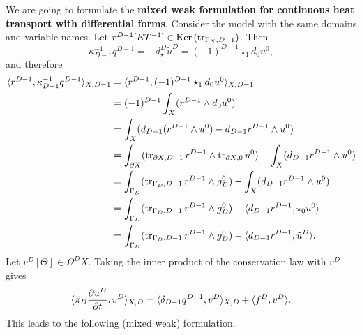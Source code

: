 \begin{discussion}
  We are going to formulate the \textbf{mixed weak formulation for continuous
  heat transport with differential forms}.
  Consider the model
  with the same domains and variable names.
  Let $r^{D - 1} [E T^{-1}] \in \mathop{\rm Ker}\nolimits \left(\mathop{\rm tr}\nolimits_{\Gamma_N, D - 1}\right)$.
  Then
  \begin{equation}
    \kappa_{D - 1}^{-1} q^{D - 1}
    = - d_\star^D \tilde{u}^D
    = (-1)^{D - 1} \star_1 d_0 u^0,
  \end{equation}
  and therefore
  \begin{equation}
    \begin{split}
      \langle r^{D - 1},\kappa_{D - 1}^{-1} q^{D - 1}\rangle_{X, D - 1}
      & = \langle r^{D - 1},(-1)^{D - 1} \star_1 d_0 u^0\rangle_{X, D - 1} \\
      & = (-1)^{D - 1} \int_X (r^{D - 1} \wedge d_0 u^0) \\
      & = \int_X
        (d_{D - 1}(r^{D - 1} \wedge u^0) - d_{D - 1} r^{D - 1} \wedge u^0) \\
      & = \int_{\partial X}
        (\mathop{\rm tr}\nolimits_{\partial X, D - 1} r^{D - 1} \wedge \mathop{\rm tr}\nolimits_{\partial X, 0} u^0)
        - \int_{X} (d_{D - 1} r^{D - 1} \wedge u^0) \\
      & = \int_{\Gamma_D} (\mathop{\rm tr}\nolimits_{\Gamma_D, D - 1} r^{D - 1} \wedge g_D^0)
        - \int_{X} (d_{D - 1} r^{D - 1} \wedge u^0) \\
      & = \int_{\Gamma_D} (\mathop{\rm tr}\nolimits_{\Gamma_D, D - 1} r^{D - 1} \wedge g_D^0)
        - \langle d_{D - 1} r^{D - 1},\star_0 u^0\rangle \\
      & = \int_{\Gamma_D} (\mathop{\rm tr}\nolimits_{\Gamma_D, D - 1} r^{D - 1} \wedge g_D^0)
        - \langle d_{D - 1} r^{D - 1},\tilde{u}^D\rangle.
    \end{split}
  \end{equation}
  Let $v^D [\Theta] \in \Omega^D X$.
  Taking the inner product of the conservation law with $v^D$ gives
  \begin{equation}
   \langle\tilde{\pi}_D \frac{\partial \tilde{u}^D}{\partial t},v^D\rangle_{X, D}
    = \langle\delta_{D - 1} q^{D - 1},v^D\rangle_{X, D} + \langle f^D,v^D\rangle.
  \end{equation}
  This leads to the following (mixed weak) formulation.
\end{discussion}

